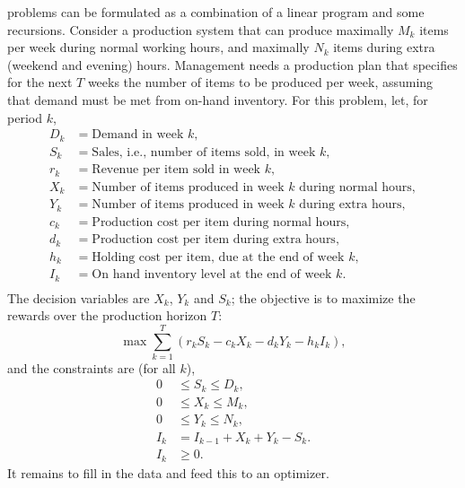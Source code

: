 \documentclass[stochastic-or.tex]{subfiles}
\begin{document}
 problems can be formulated as a combination of a linear program and some recursions.
Consider a production system that can produce maximally $M_k$ items per week during normal working hours, and maximally $N_k$ items during extra (weekend and evening) hours.
Management needs a production plan that specifies for the next $T$ weeks the number of items to be produced per week, assuming that demand must be met from on-hand inventory.
For this problem, let, for period $k$,
 \begin{align*}
 D_k &= \text{Demand in week $k$}, \\
 S_k &= \text{Sales, i.e., number of items sold, in week $k$}, \\
 r_k &= \text{Revenue per item sold in week $k$}, \\
 X_k &= \text{Number of items produced in week $k$ during normal hours}, \\
 Y_k &= \text{Number of items produced in week $k$ during extra hours}, \\
 c_k &= \text{Production cost per item during normal hours}, \\
 d_k &= \text{Production cost per item during extra hours}, \\
 h_k &= \text{Holding cost per item, due at the end of week $k$}, \\
 I_k &= \text{On hand inventory level at the end of week $k$}. \\
 \end{align*}
The  decision variables are $X_k$, $Y_k$ and $S_k$; the objective is to maximize the rewards over the production horizon $T$:
 \begin{equation*}
 \max \sum_{k=1}^T (r_kS_k -c_k X_k - d_k Y_k - h_k I_k),
 \end{equation*}
and the constraints are (for all $k$),
\begin{align*}
 0&\leq S_k \leq D_k, \\
 0&\leq X_k \leq M_k, \\
 0&\leq Y_k \leq N_k, \\
 I_k&=I_{k-1}+X_k+Y_k - S_k. \\
I_k &\geq 0.
\end{align*}
It remains to fill in the data and feed this to an optimizer.
\end{document}
